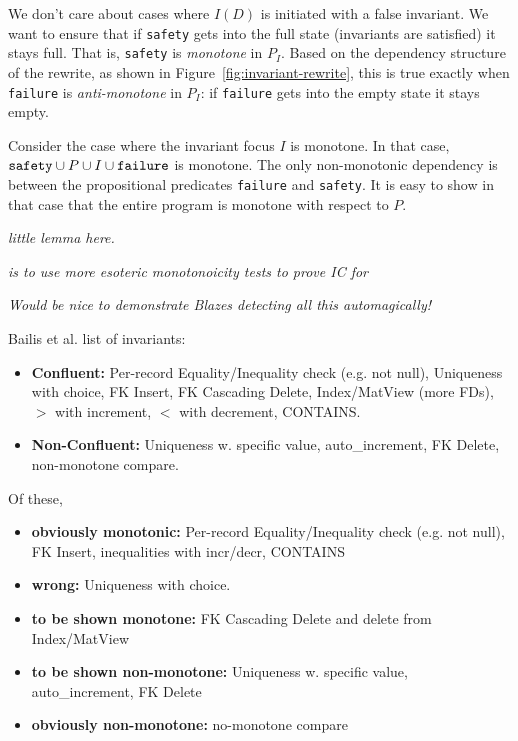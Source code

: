 \documentclass{sig-alternate}
\begin{document}
We don't care about cases where $I(D)$ is initiated with a false invariant.  We want to ensure that if \texttt{safety} gets into the full state (invariants are satisfied) it stays full.  That is, \texttt{safety} is \emph{monotone} in $P_I$.   Based on the dependency structure of the rewrite, as shown in Figure~\ref{fig:invariant-rewrite}, this is true exactly when \texttt{failure} is \emph{anti-monotone} in $P_I$: if \texttt{failure} gets into the empty state it stays empty.  

Consider the case where the invariant focus $I$ is monotone.  In that case, $\mbox{\texttt{safety}} \cup P \cup I \cup \mbox{\texttt{failure}}$ is monotone. The only non-monotonic dependency is between the propositional predicates \texttt{failure} and \texttt{safety}.  It is easy to show in that case that the entire program is monotone with respect to $P$.

\emph{little lemma here.}

\emph{ is to use more esoteric monotonoicity tests to prove IC for }

\emph{Would be nice to demonstrate Blazes detecting all this automagically!}

Bailis et al. list of invariants:
\begin{itemize}
\item {\bf Confluent:} Per-record Equality/Inequality check (e.g. not null), Uniqueness with choice, FK Insert, FK Cascading Delete, Index/MatView (more FDs), $>$ with increment, $<$ with decrement, CONTAINS.
\item {\bf Non-Confluent:} Uniqueness w. specific value, auto\_increment, FK Delete, non-monotone compare.
\end{itemize}

Of these, 
\begin{itemize}
\item {\bf obviously monotonic:} Per-record Equality/Inequality check (e.g. not null), FK Insert, inequalities with incr/decr, CONTAINS
\item {\bf wrong:} Uniqueness with choice.
\item {\bf to be shown monotone:} FK Cascading Delete and delete from Index/MatView
\item {\bf to be shown non-monotone:} Uniqueness w. specific value, auto\_increment, FK Delete
\item {\bf obviously non-monotone:} no-monotone compare
\end{itemize}
\end{document}

